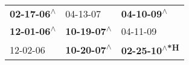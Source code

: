 \begin{supertabular}{lll}
 \textbf{02-17-06\textsuperscript{$\wedge$}} &                   04-13-07\textsuperscript{} &    \textbf{04-10-09\textsuperscript{$\wedge$}} \\
 \textbf{12-01-06\textsuperscript{$\wedge$}} &  \textbf{10-19-07\textsuperscript{$\wedge$}} &                     04-11-09\textsuperscript{} \\
                  12-02-06\textsuperscript{} &  \textbf{10-20-07\textsuperscript{$\wedge$}} &  \textbf{02-25-10\textsuperscript{$\wedge$*H}} \\
\end{supertabular}
